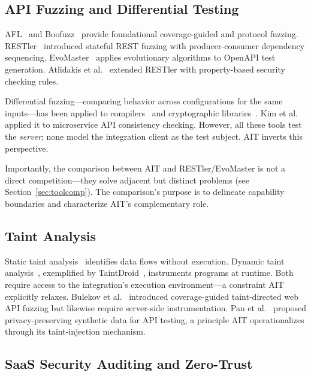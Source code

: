 \documentclass[conference]{IEEEtran}
\begin{document}
\subsection{API Fuzzing and Differential Testing}

AFL~\cite{afl} and Boofuzz~\cite{boofuzz} provide foundational
coverage-guided and protocol fuzzing. RESTler~\cite{restler} introduced
stateful REST fuzzing with producer-consumer dependency sequencing.
EvoMaster~\cite{evomaster} applies evolutionary algorithms to OpenAPI
test generation. Atlidakis et al.~\cite{atlidakis2022} extended
RESTler with property-based security checking rules.

Differential fuzzing---comparing behavior across configurations for the
same inputs---has been applied to compilers~\cite{yang2011} and
cryptographic libraries~\cite{petsios2017}. Kim et al.~\cite{kim2022}
applied it to microservice API consistency checking. However, all
these tools test the \emph{server}; none model the integration
client as the test subject. AIT inverts this perspective.

Importantly, the comparison between AIT and RESTler/EvoMaster is not a
direct competition---they solve adjacent but distinct problems (see
Section~\ref{sec:toolcomp}). The comparison's purpose is to delineate
capability boundaries and characterize AIT's complementary role.

\subsection{Taint Analysis}

Static taint analysis~\cite{livshits2005} identifies data flows without
execution. Dynamic taint analysis~\cite{clause2007}, exemplified by
TaintDroid~\cite{enck2014}, instruments programs at runtime. Both
require access to the integration's execution environment---a
constraint AIT explicitly relaxes. Bulekov et al.~\cite{bulekov2023}
introduced coverage-guided taint-directed web API fuzzing but likewise
require server-side instrumentation. Pan et al.~\cite{pan2022} proposed
privacy-preserving synthetic data for API testing, a principle AIT
operationalizes through its taint-injection mechanism.

\subsection{SaaS Security Auditing and Zero-Trust}
\end{document}
